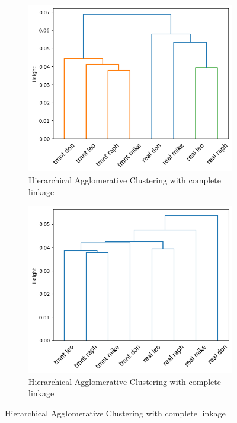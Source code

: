 \documentclass[12pt]{article}
\begin{document}
\begin{figure}
    \begin{subfigure}{0.5\textwidth}
        \centering
        \includegraphics[width=\linewidth]{../plots/tmnt_complete.png}
        \caption{Hierarchical Agglomerative Clustering with complete linkage}
        \label{fig:sub1}
    \end{subfigure}
    \begin{subfigure}{0.5\textwidth}
        \centering
        \includegraphics[width=\linewidth]{../plots/tmnt_single.png}
        \caption{Hierarchical Agglomerative Clustering with complete linkage}
        \label{fig:sub2}
    \end{subfigure}
\end{figure}
\end{document}
